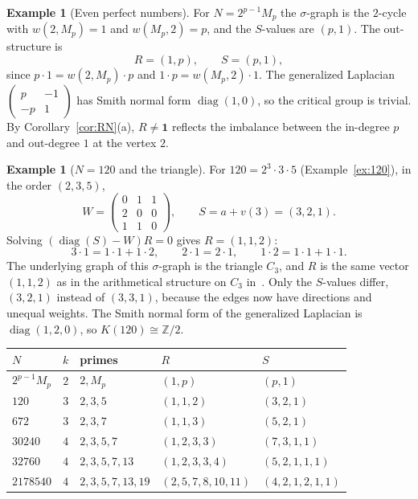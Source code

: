 \documentclass[11pt]{article}
\theoremstyle{definition}
\newtheorem{example}[theorem]{Example}
\theoremstyle{remark}
\newcommand{\one}{\mathbf{1}}
\begin{document}
\begin{example}[Even perfect numbers]\label{ex:arith-even}
For $N=2^{p-1}M_p$ the $\sigma$-graph is the $2$-cycle with $w(2,M_p)=1$
and $w(M_p,2)=p$, and the $S$-values are $(p,1)$.  The out-structure is
\[
R=(1,p),\qquad S=(p,1),
\]
since $p\cdot1=w(2,M_p)\cdot p$ and $1\cdot p=w(M_p,2)\cdot1$.  The
generalized Laplacian $\begin{pmatrix}p&-1\\-p&1\end{pmatrix}$ has Smith
normal form $\operatorname{diag}(1,0)$, so the critical group is trivial.
By Corollary~\ref{cor:RN}(a), $R\ne\one$ reflects the imbalance between
the in-degree $p$ and out-degree $1$ at the vertex $2$.
\end{example}

\begin{example}[$N=120$ and the triangle]\label{ex:arith-120}
For $120=2^3\cdot3\cdot5$ (Example~\ref{ex:120}), in the order $(2,3,5)$,
\[
W=\begin{pmatrix}0&1&1\\2&0&0\\1&1&0\end{pmatrix},\qquad
S=a+v(3)=(3,2,1).
\]
Solving $(\operatorname{diag}(S)-W)R=0$ gives $R=(1,1,2)$:
\[
3\cdot1=1\cdot1+1\cdot2,\qquad
2\cdot1=2\cdot1,\qquad
1\cdot2=1\cdot1+1\cdot1 .
\]
The underlying graph of this $\sigma$-graph is the triangle $C_3$, and $R$
is the same vector $(1,1,2)$ as in the arithmetical structure on $C_3$
in~\cite{MJappl}.  Only the $S$-values differ, $(3,2,1)$ instead of
$(3,3,1)$, because the edges now have directions and unequal weights.  The
Smith normal form of the generalized Laplacian is $\operatorname{diag}(1,2,0)$,
so $K(120)\cong\mathbb Z/2$.
\end{example}

\begin{center}
\begin{tabular}{@{}lclll@{}}
\toprule
$N$ & $k$ & primes & $R$ & $S$\\
\midrule
$2^{p-1}M_p$ & $2$ & $2,M_p$ & $(1,p)$ & $(p,1)$\\
$120$ & $3$ & $2,3,5$ & $(1,1,2)$ & $(3,2,1)$\\
$672$ & $3$ & $2,3,7$ & $(1,1,3)$ & $(5,2,1)$\\
$30240$ & $4$ & $2,3,5,7$ & $(1,2,3,3)$ & $(7,3,1,1)$\\
$32760$ & $4$ & $2,3,5,7,13$ & $(1,2,3,3,4)$ & $(5,2,1,1,1)$\\
$2178540$ & $4$ & $2,3,5,7,13,19$ & $(2,5,7,8,10,11)$ & $(4,2,1,2,1,1)$\\
\bottomrule
\end{tabular}
\end{center}
\end{document}
